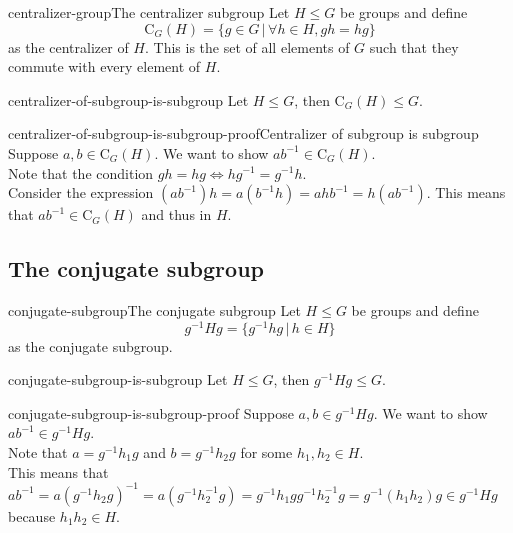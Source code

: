\documentclass[preview]{standalone}
\begin{document}
\begin{snippetdefinition}{centralizer-group}{The centralizer subgroup}
    Let \(H \leq G\) be groups and define
    \[
        \text{C}_G(H) = \{
            g \in G \,|\, \forall h \in H, gh=hg
        \}
    \]
    as the centralizer of \(H\).
    This is the set of all elements of \(G\) such that they commute with every element of \(H\).
\end{snippetdefinition}

\begin{snippettheorem}{centralizer-of-subgroup-is-subgroup}{}
    Let \(H \leq G\), then \(\text{C}_G(H) \leq G\).
\end{snippettheorem}

\begin{snippetproof}{centralizer-of-subgroup-is-subgroup-proof}{Centralizer of subgroup is subgroup}
    Suppose \(a,b \in \text{C}_G(H)\).
    We want to show \(ab^{-1} \in \text{C}_G(H)\).\\
    Note that the condition \(gh=hg \iff hg^{-1}=g^{-1}h\).\\
    Consider the expression \((ab^{-1})h = a(b^{-1}h) = ahb^{-1} = h(ab^{-1})\).
    This means that \(ab^{-1} \in \text{C}_G(H)\) and thus in \(H\).
\end{snippetproof}

\subsection{The conjugate subgroup}

\begin{snippetdefinition}{conjugate-subgroup}{The conjugate subgroup}
    Let \(H \leq G\) be groups and define
    \[
        g^{-1}Hg = \{
            g^{-1}hg \,|\, h \in H    
        \}
    \]
    as the conjugate subgroup.
\end{snippetdefinition}

\begin{snippettheorem}{conjugate-subgroup-is-subgroup}{}
    Let \(H \leq G\), then \(g^{-1}Hg \leq G\).
\end{snippettheorem}

\begin{snippetproof}{conjugate-subgroup-is-subgroup-proof}{}
    Suppose \(a,b \in g^{-1}Hg\).
    We want to show \(ab^{-1} \in g^{-1}Hg\).\\
    Note that \(a = g^{-1}h_1g\) and \(b = g^{-1}h_2g\)
    for some \(h_1, h_2 \in H\). \\
    This means that \(ab^{-1}=a{(g^{-1}h_2g)}^{-1} = a(g^{-1}h_2^{-1}g)
    =g^{-1}h_1gg^{-1}h_2^{-1}g = g^{-1} (h_1h_2) g \in g^{-1}Hg \)
    because \(h_1h_2 \in H\).
\end{snippetproof}
\end{document}
